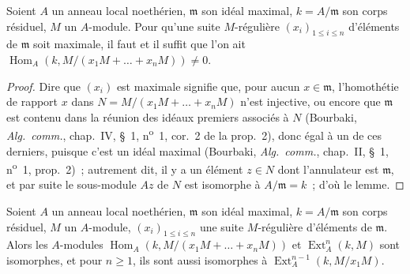 \begin{lemma}[16.4.2]
\label{0.16.4.2-fr}
Soient $A$ un anneau local noethérien, $\mathfrak{m}$ son idéal maximal,
$k=A/\mathfrak{m}$ son corps résiduel, $M$ un $A$-module. Pour qu'une suite
$M$-régulière $(x_i)_{1\leq i\leq n}$ d'éléments de $\mathfrak{m}$ soit
maximale, il faut et il suffit que l'on ait
$\operatorname{Hom}_A(k,M/(x_1M+\ldots+x_nM))\neq0$.
\end{lemma}

\begin{proof}
Dire que $(x_i)$ est maximale signifie que, pour aucun $x\in\mathfrak{m}$,
l'homothétie de rapport $x$ dans $N=M/(x_1M+\ldots+x_nM)$ n'est injective, ou
encore que $\mathfrak{m}$ est contenu dans la réunion des idéaux premiers
associés à $N$ (Bourbaki, \emph{Alg.~comm.}, chap.~IV, \S~1, n\textsuperscript{o}~1, cor.~2 de
la prop.~2), donc égal à un de ces derniers, puisque c'est un idéal
maximal (Bourbaki, \emph{Alg.~comm.}, chap.~II, \S~1, n\textsuperscript{o}~1, prop.~2)~;
autrement dit, il y a un élément $z\in N$ dont l'annulateur est
$\mathfrak{m}$, et par suite le sous-module $Az$ de $N$ est isomorphe à
$A/\mathfrak{m}=k$~; d'où le lemme.
\end{proof}

\begin{lemma}[16.4.3]
\label{0.16.4.3-fr}
Soient $A$ un anneau local noethérien, $\mathfrak{m}$ son idéal maximal,
$k=A/\mathfrak{m}$ son corps résiduel, $M$ un $A$-module,
$(x_i)_{1\leq i\leq n}$ une suite $M$-régulière d'éléments de
$\mathfrak{m}$. Alors les $A$-modules
$\operatorname{Hom}_A(k,M/(x_1M+\ldots+x_nM))$ et $\operatorname{Ext}^n_A(k,M)$
sont isomorphes, et pour $n\geq1$, ils sont aussi isomorphes à
$\operatorname{Ext}^{n-1}_A(k,M/x_1M)$.
\end{lemma}

